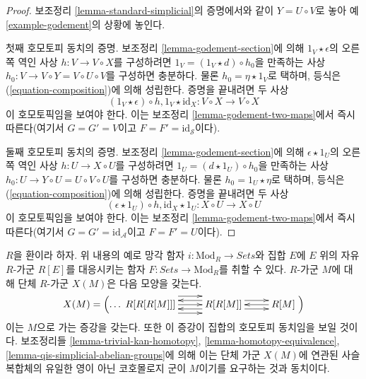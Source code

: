\begin{proof}
보조정리 \ref{lemma-standard-simplicial}의 증명에서와 같이
$Y = U \circ V$로 놓아 예 \ref{example-godement}의 상황에 놓인다.

\medskip\noindent
첫째 호모토피 동치의 증명. 보조정리 \ref{lemma-godement-section}에
의해 $1_V \star \epsilon$의 오른쪽 역인 사상
$h : V \to V \circ X$를 구성하려면
$1_V = (1_V \star d) \circ h_0$을 만족하는 사상
$h_0 : V \to V \circ Y = V \circ U \circ V$를 구성하면 충분하다.
물론 $h_0 = \eta \star 1_V$로 택하며, 등식은
(\ref{equation-composition})에 의해 성립한다. 증명을 끝내려면 두 사상
$$
(1_V \star \epsilon) \circ h, 1_V \star \text{id}_X :
V \circ X \longrightarrow V \circ X
$$
이 호모토픽임을 보여야 한다. 이는 보조정리
\ref{lemma-godement-two-maps}에서 즉시 따른다(여기서
$G = G' = V$이고 $F = F' = \text{id}_\mathcal{S}$이다).

\medskip\noindent
둘째 호모토피 동치의 증명. 보조정리 \ref{lemma-godement-section}에
의해 $\epsilon \star 1_U$의 오른쪽 역인 사상
$h : U \to X \circ U$를 구성하려면
$1_U = (d \star 1_U) \circ h_0$을 만족하는 사상
$h_0 : U \to Y \circ U = U \circ V \circ U$를 구성하면 충분하다.
물론 $h_0 = 1_U \star \eta$로 택하며, 등식은
(\ref{equation-composition})에 의해 성립한다. 증명을 끝내려면 두 사상
$$
(\epsilon \star 1_U) \circ h, \text{id}_X \star 1_U :
X \circ U \longrightarrow X \circ U
$$
이 호모토픽임을 보여야 한다. 이는 보조정리
\ref{lemma-godement-two-maps}에서 즉시 따른다(여기서
$G = G' = \text{id}_\mathcal{A}$이고 $F = F' = U$이다).
\end{proof}


\begin{example}
\label{example-module}
$R$을 환이라 하자. 위 내용의 예로 망각 함자
$i : \text{Mod}_R \to \textit{Sets}$와 집합 $E$에 $E$ 위의 자유
$R$-가군 $R[E]$를 대응시키는 함자
$F : \textit{Sets} \to \text{Mod}_R$를 취할 수 있다. $R$-가군 $M$에
대해 단체 $R$-가군 $X(M)$은 다음 모양을 갖는다.
$$
X(M) =
\left( \ldots
\xymatrix{
R[R[R[M]]]
\ar@<2ex>[r]
\ar@<0ex>[r]
\ar@<-2ex>[r]
&
R[R[M]]
\ar@<1ex>[r]
\ar@<-1ex>[r]
\ar@<1ex>[l]
\ar@<-1ex>[l]
&
R[M]
\ar@<0ex>[l]
}
\right)
$$
이는 $M$으로 가는 증강을 갖는다. 또한 이 증강이 집합의 호모토피
동치임을 보일 것이다. 보조정리들
\ref{lemma-trivial-kan-homotopy}, \ref{lemma-homotopy-equivalence},
\ref{lemma-qis-simplicial-abelian-groups}에 의해 이는 단체 가군
$X(M)$에 연관된 사슬 복합체의 유일한 영이 아닌 코호몰로지 군이
$M$이기를 요구하는 것과 동치이다.
\end{example}

